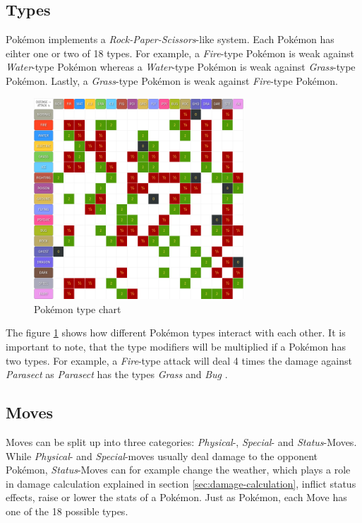 \subsection{Types}
\label{sec:types}
Pokémon implements a \textit{Rock-Paper-Scissors}-like system. Each Pokémon has eihter one or two of 
18 types. For example, a \textit{Fire}-type Pokémon is weak against \textit{Water}-type Pokémon
whereas a \textit{Water}-type Pokémon is weak against \textit{Grass}-type Pokémon. Lastly,
a \textit{Grass}-type Pokémon is weak against \textit{Fire}-type Pokémon. 
\begin{figure}
	\centering
	\includegraphics[width=0.7\textwidth]{images/type_chart.png}
	\caption{Pokémon type chart \cite{Pokemondb:Type}}
	\label{fig:type_chart}
\end{figure}
The figure \ref{fig:type_chart} shows how different Pokémon types interact with each other. It is important
to note, that the type modifiers will be multiplied if a Pokémon has two types. For example, a \textit{Fire}-type
attack will deal 4 times the damage against \textit{Parasect} as \textit{Parasect} has the types \textit{Grass} and
\textit{Bug} \cite{Veekun:Parasect}.

\subsection{Moves}
\label{sec:moves}
Moves can be split up into three categories: \textit{Physical}-, \textit{Special}- and \textit{Status}-Moves.
While \textit{Physical}- and \textit{Special}-moves usually deal damage to the opponent Pokémon, 
\textit{Status}-Moves can for example change the weather, which plays a role in damage calculation explained
in section \ref{sec:damage-calculation}, inflict status effects, raise or lower the stats of a Pokémon. Just 
as Pokémon, each Move has one of the 18 possible types. 

